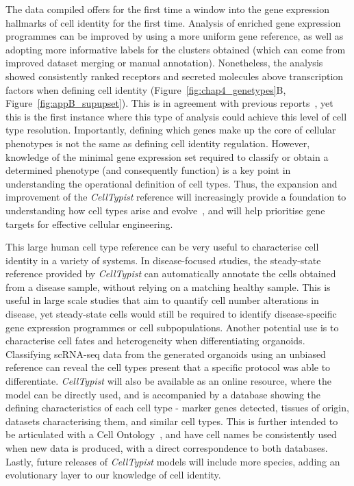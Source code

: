 The data compiled offers for the first time a window into the gene expression hallmarks of cell identity for the first time. Analysis of enriched gene expression programmes can be improved by using a more uniform gene reference, as well as adopting more informative labels for the clusters obtained (which can come from improved dataset merging or manual annotation). Nonetheless, the analysis showed consistently ranked receptors and secreted molecules above transcription factors when defining cell identity (Figure~\ref{fig:chap4_genetypes}B, Figure~\ref{fig:appB_supupset}). This is in agreement with previous reports~\citep{sonawane_understanding_2017}, yet this is the first instance where this type of analysis could achieve this level of cell type resolution. Importantly, defining which genes make up the core of cellular phenotypes is not the same as defining cell identity regulation. However, knowledge of the minimal gene expression set required to classify or obtain a determined phenotype (and consequently function) is a key point in understanding the operational definition of cell types. Thus, the expansion and improvement of the \textit{CellTypist} reference will increasingly provide a foundation to understanding how cell types arise and evolve~\citep{zimmermann_ancient_2019}, and will help prioritise gene targets for effective cellular engineering.

This large human cell type reference can be very useful to characterise cell identity in a variety of systems. In disease-focused studies, the steady-state reference provided by \textit{CellTypist} can automatically annotate the cells obtained from a disease sample, without relying on a matching healthy sample. This is useful in large scale studies that aim to quantify cell number alterations in disease, yet steady-state cells would still be required to identify disease-specific gene expression programmes or cell subpopulations. Another potential use is to characterise cell fates and heterogeneity when differentiating organoids. Classifying scRNA-seq data from the generated organoids using an unbiased reference can reveal the cell types present that a specific protocol was able to differentiate. \textit{CellTypist} will also be available as an online resource, where the model can be directly used, and is accompanied by a database showing the defining characteristics of each cell type - marker genes detected, tissues of origin, datasets characterising them, and similar cell types. This is further intended to be articulated with a Cell Ontology~\citep{bard_ontology_2005}, and have cell names be consistently used when new data is produced, with a direct correspondence to both databases. Lastly, future releases of \textit{CellTypist} models will include more species, adding an evolutionary layer to our knowledge of cell identity.


